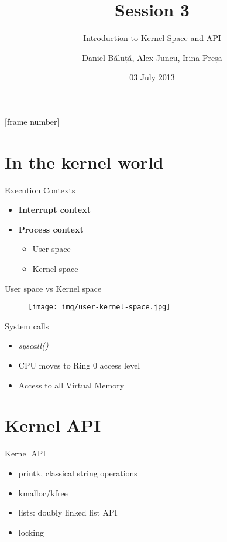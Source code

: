 \documentclass{workshop}
\title[Session 3]{Session 3}
\subtitle{Introduction to Kernel Space and API}
\author{Daniel Băluță, Alex Juncu, Irina Preșa}
\date{03 July 2013}
\begin{document}
[frame number]

\frame{\titlepage}

\section{In the kernel world}

\begin{frame}{Execution Contexts}
  \begin{itemize}
    \item \textbf{Interrupt context}
    \item \textbf{Process context}
    \begin{itemize}
      \item User space
      \item Kernel space
    \end{itemize}
  \end{itemize}
\end{frame}


\begin{frame}{User space vs Kernel space}
  \begin{figure}
    \texttt{[image: img/user-kernel-space.jpg]}
  \end{figure}
\end{frame}

\begin{frame}{System calls}
  \begin{itemize}
    \item \emph{syscall()}
    \item CPU moves to Ring 0 access level
    \item Access to all Virtual Memory
  \end{itemize}
\end{frame}



\section{Kernel API}
\begin{frame}{Kernel API}
\begin{itemize}
\item printk, classical string operations
\item kmalloc/kfree
\item lists: doubly linked list API
\item locking
\end{itemize}
\end{frame}
\end{document}
